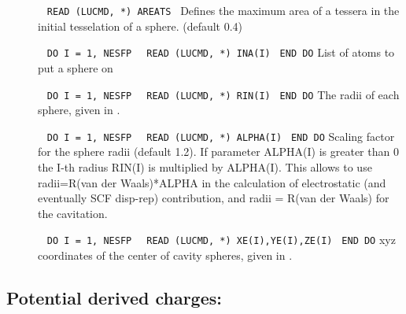 \begin{description}
    
\item[]\verb| |\newline
\verb|READ (LUCMD, *) AREATS|\verb| |\newline
Defines the maximum area of a tessera in the initial tesselation of a
sphere. (default 0.4)

\item[]\verb| |\newline
\verb|DO I = 1, NESFP|\newline
\verb|  READ (LUCMD, *) INA(I)|\verb| |\newline
\verb|END DO|\newline
List of atoms to put a sphere on

\item[]\verb| |\newline
\verb|DO I = 1, NESFP|\newline
\verb|  READ (LUCMD, *) RIN(I)|\verb| |\newline
\verb|END DO|\newline
The radii of each sphere, given in \angstrom{}.

\item[]\verb| |\newline
\verb|DO I = 1, NESFP|\newline
\verb|  READ (LUCMD, *) ALPHA(I)|\verb| |\newline
\verb|END DO|\newline
Scaling factor for the sphere radii (default 1.2). If parameter
ALPHA(I) is greater than 0 the I-th radius RIN(I) is multiplied by
ALPHA(I). This allows to use radii=R(van der Waals)*ALPHA in the
calculation of electrostatic (and eventually SCF disp-rep)
contribution, and radii = R(van der Waals) for the cavitation.

\item[]\verb| |\newline
\verb|DO I = 1, NESFP|\newline
\verb|  READ (LUCMD, *) XE(I),YE(I),ZE(I)|\verb| |\newline
\verb|END DO|\newline
xyz coordinates of the center of cavity spheres, given in \angstrom{}.

\end{description}

\subsection{Potential derived charges: }
\label{subsec:qfit}

